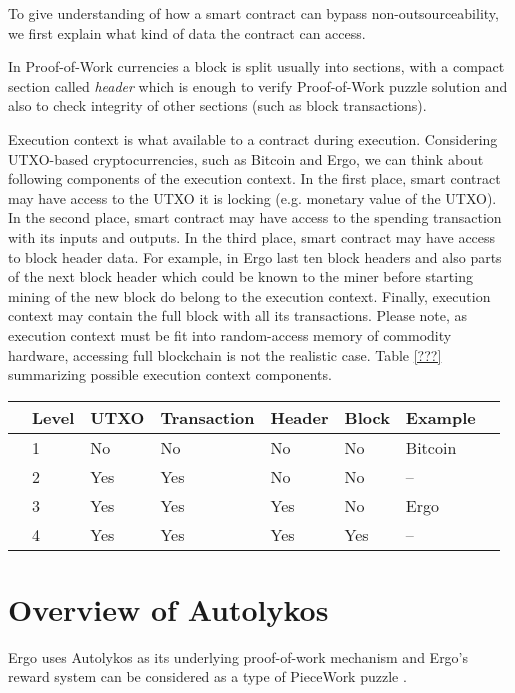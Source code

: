 \documentclass[11pt]{article}
\newcommand{\authnote}[2]{\marginpar{\parbox{\marginparwidth}{\tiny %
  \textsf{#1 {\textcolor{blue}{notes: #2}}}}}%
  \textcolor{blue}{\textbf{\dag}}}
\newcommand{\authnote}[2]{
  \textsf{#1 \textcolor{blue}{: #2}}}
\newcommand{\authnote}[2]{}
\newcommand{\snote}[1]{{\authnote{\textcolor{yellow}{Scalahub notes}}{#1}}}
\newcommand{\powname}{Autolykos\xspace}
\begin{document}
To give understanding of how a smart contract can bypass non-outsourceability, we first explain what kind of data the contract
can access.

In Proof-of-Work currencies a block is split usually into sections, with a compact section called {\em header} which is
enough to verify Proof-of-Work puzzle solution and also to check integrity of other sections (such as block transactions).

Execution context is what available to a contract during execution. Considering UTXO-based cryptocurrencies, such as
Bitcoin and Ergo, we can think about following components of the execution context. In the first place, smart contract
 may have access to the UTXO it is locking (e.g. monetary value of the UTXO). In the second place, smart contract may
 have access to the spending transaction with its inputs and outputs. In the third place, smart contract may have access
 to block header data. For example, in Ergo last ten block headers and also parts of the next block header which could
 be known to the miner before starting mining of the new block do belong to the execution context. Finally, execution
 context may contain the full block with all its transactions. Please note, as execution context must be fit into
 random-access memory of commodity hardware, accessing full blockchain is not the realistic case. Table \ref{???}
 summarizing possible execution context components.


\begin{tabular}{llllllll}
	& Level & UTXO & Transaction & Header      & Block & Example \\ \hline
	& 1     & No  & No          & No  		   & No    & Bitcoin \\
	& 2     & Yes & Yes         & No 		   & No    & -- \\
	& 3     & Yes & Yes         & Yes 		   & No    & Ergo    \\
	& 4     & Yes & Yes         & Yes 		   & Yes   & --    \\
\end{tabular}
	
\section{Overview of \powname}

Ergo uses \powname as its underlying proof-of-work mechanism and Ergo's reward system can be considered as a type of PieceWork puzzle \snote{Check validity of this statement}. 
\end{document}
